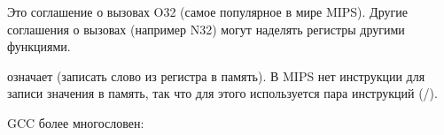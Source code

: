 Это соглашение о вызовах O32 (самое популярное в мире MIPS).
Другие соглашения о вызовах (например N32) могут наделять регистры другими функциями.

 означает  (записать слово из регистра в память).
В MIPS нет инструкции для записи значения в память, так что для этого используется пара инструкций (/).






\NonOptimizing GCC более многословен:





